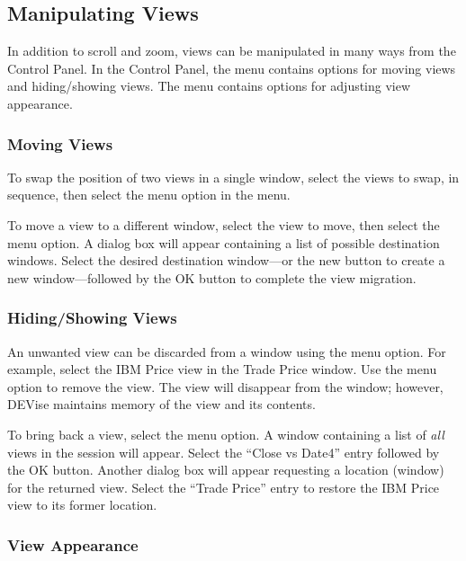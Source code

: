 
\subsection{Manipulating Views}

In addition to scroll and zoom, views can be manipulated in many ways from the
Control Panel. In the Control Panel, the  menu contains options for
moving views and hiding/showing views. The  menu contains options
for adjusting view appearance.

\subsubsection{Moving Views}

To swap the position of two views in a single window, select the views to
swap, in sequence, then select the  menu option in the
 menu.

To move a view to a different window, select the view to move, then select the
 menu option. A dialog box will appear containing a list of
possible destination windows. Select the desired destination window---or the new
button to create a new window---followed by the OK button to complete the view
migration.

\subsubsection{Hiding/Showing Views}

An unwanted view can be discarded from a window using the 
menu option. For example, select the IBM Price view in the Trade Price
window. Use the  menu option to remove the view. The view will
disappear from the window; however, DEVise maintains memory of the view and its
contents.

To bring back a view, select the  menu option. A window
containing a list of {\em all} views in the session will appear. Select the
``Close vs Date4'' entry followed by the OK button. Another dialog box will
appear requesting a location (window) for the returned view. Select the ``Trade
Price'' entry to restore the IBM Price view to its former location.

\subsubsection{View Appearance}

